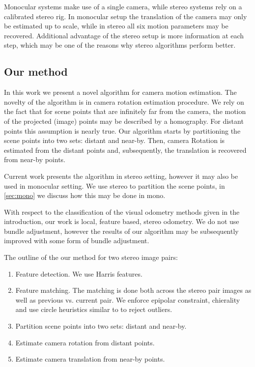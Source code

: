 \documentclass{bmvc2k}
\begin{document}
Monocular systems \cite{Song} make use of a single camera, while
stereo systems \cite{Geiger2011} rely on a calibrated stereo rig. In
monocular setup the translation of the camera may only be estimated up
to scale, while in stereo all six motion parameters may be
recovered. Additional advantage of the stereo setup is more
information at each step, which may be one of the reasons why stereo
algorithms perform better.

\subsection{Our method}

In this work we present a novel algorithm for camera motion
estimation.  The novelty of the algorithm is in camera rotation
estimation procedure.  We rely on the fact that for scene points that
are infinitely far from the camera, the motion of the projected
(image) points may be described by a homography. For distant points
this assumption is nearly true.  Our algorithm starts by partitioning
the scene points into two sets: distant and near-by. Then, camera
Rotation is estimated from the distant points and, subsequently, the
translation is recovered from near-by points.

Current work presents the algorithm in stereo setting, however it may
also be used in monocular setting. We use stereo to partition the
scene points, in \ref{sec:mono} we discuss how this may be done in
mono.

With respect to the classification of the visual odometry methods
given in the introduction, our work is local, feature based, stereo
odometry.  We do not use bundle adjustment, however the results of our
algorithm may be subsequently improved with some form of bundle
adjustment.

The outline of the our method for two stereo image pairs:
\begin{enumerate}
\item Feature detection.  We use Harris \cite{Harris1987} features.
\item Feature matching. The matching is done both across the stereo
  pair images as well as previous vs. current pair.  We enforce
  epipolar constraint, chierality and use circle heuristics similar to
  \cite{Geiger2011} to reject outliers.
\item Partition scene points into two sets: distant and near-by.
\item Estimate camera rotation from distant points.
\item Estimate camera translation from near-by points.
\end{enumerate}
\end{document}
